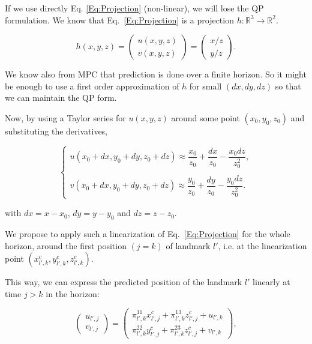 If we use directly Eq. \ref{Eq:Projection} (non-linear), we will lose the QP formulation. 
We know that Eq.~\ref{Eq:Projection} is a projection $h:\mathbb{R}^3 \rightarrow \mathbb{R}^2$.

\begin{equation*}
h(x,y,z) =
 \left(
 \begin{matrix}
  u(x,y,z) \\
  v(x,y,z)
 \end{matrix}
 \right)
 = \left(
 \begin{matrix}
  x / z\\
  y / z
 \end{matrix}
 \right).
\end{equation*}


We know also from MPC that prediction is done over a finite horizon. So it might be enough to use a first order approximation of $h$ for small $(dx,dy,dz)$ so that we can maintain the QP form.

Now, by using a Taylor series for $u(x,y,z)$ around some point $(x_0,y_0,z_0)$ and substituting the derivatives,


$$
\left\{
\begin{array}{c}
\nonumber
 u(x_0+dx,y_0+dy,z_0+dz) \approx \dfrac{x_0}{z_0} +  \dfrac{dx}{z_0} - \dfrac{x_0 dz}{z_0^2},\\ \\
 v(x_0+dx,y_0+dy,z_0+dz) \approx \dfrac{y_0}{z_0} +  \dfrac{dy}{z_0} - \dfrac{y_0 dz}{z_0^2}.
\end{array}
\right.
$$

with $dx=x-x_0$, $dy=y-y_0$ and $dz=z-z_0$. 

We propose to apply such a linearization of Eq.~\ref{Eq:Projection} for the whole horizon, around the first position $(j=k)$ of landmark $l'$, i.e. at the linearization point $(x^{c}_{l',k},y^{c}_{l',k},z^{c}_{l',k})$. 

This way, we can express the predicted position of the landmark $l'$ linearly at time $j>k$ in the horizon:

\begin{equation*}
 \left(
 \begin{matrix}
  u_{l',j} \\
  v_{l',j}
 \end{matrix}
 \right)
 = \left(
 \begin{matrix}
  \pi^{11}_{l',k} x^{c}_{l',j} + \pi^{13}_{l',k} z^{c}_{l',j}+ u_{l',k}\\
  \pi^{22}_{l',k} y^{c}_{l',j} + \pi^{23}_{l',k} z^{c}_{l',j} + v_{l',k}
 \end{matrix}
 \right),
\end{equation*}

